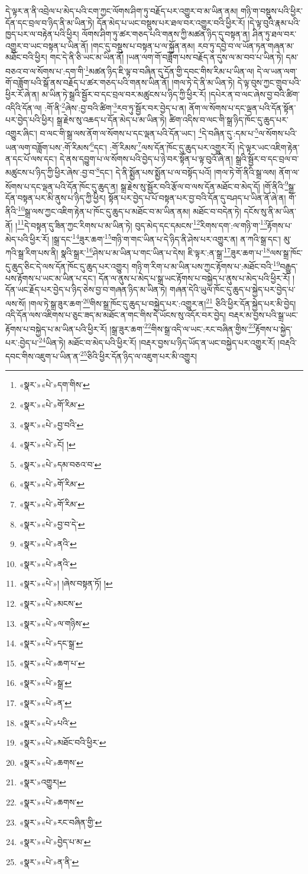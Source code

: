 དེ་ལྟར་ན་ནི་འབྲེལ་པ་མེད་པའི་ངག་ཀྱང་ལོགས་ཤིག་ཏུ་བརྗོད་པར་འགྱུར་བ་མ་ཡིན་ནམ། གཉི་ག་བསྡུས་པའི་ཕྱིར་དོན་དང་བྲལ་བ་ཉིད་ནི་མ་ཡིན་ཏེ། དོན་མེད་པ་ཡང་བསྡུས་པར་ཐལ་བར་འགྱུར་བའི་ཕྱིར་རོ། །དེ་ལྟ་བུའི་རྣམ་པའི་ཁྱད་པར་ལ་བརྟེན་པའི་ཕྱིར། ལོགས་ཤིག་ཏུ་ཚར་གཅད་པའི་གནས་ཀྱི་མཚན་ཉིད་དུ་བསྟན་ན། ཤིན་ཏུ་ཐལ་བར་འགྱུར་བ་ཡང་བསྟན་པ་ཡིན་ནོ། །གང་དུ་བསྡུས་པ་བསྟན་པ་ལ་སྐྱོན་ནམ། རབ་ཏུ་དབྱེ་བ་ལ་ཡོན་ཏན་གཞན་མ་མཐོང་བའི་ཕྱིར། གང་དེ་ནི་ཅི་ཡང་མ་ཡིན་ནོ། །ཡན་ལག་གོ་བཟློག་པས་བརྗོད་ན་དུས་ལ་མ་བབ་པ་ཡིན་ཏེ། དམ་བཅའ་བ་ལ་སོགས་པ་:དག་གི་\footnote{«སྣར་»«པེ་»དག་གིས་}མཚན་ཉིད་ཇི་ལྟ་བ་བཞིན་དུ་དོན་གྱི་དབང་གིས་རིམ་པ་ཡིན་ལ། དེ་ལ་ཡན་ལག་གོ་བཟློག་པའི་སྒོ་ནས་བརྗོད་པ་ཚར་གཅད་པའི་གནས་ཡིན་ནོ། །གལ་ཏེ་དེ་ནི་མ་ཡིན་ཏེ། དེ་ལྟ་བུས་ཀྱང་གྲུབ་པའི་ཕྱིར་རོ་ཞེ་ན། མ་ཡིན་ཏེ་སྒྲའི་སྦྱོར་བ་དང་བྲལ་བར་མཚུངས་པ་ཉིད་ཀྱི་ཕྱིར་རོ། །དཔེར་ན་བ་ལང་ཞེས་བྱ་བའི་ཚིག་འདིའི་དོན་ལ། :གོ་ནི་\footnote{«སྣར་»«པེ་»གོ་རིམ་}ཞེས་:བྱ་བའི་ཚིག་\footnote{«སྣར་»«པེ་»བྱ་བའི་}རབ་ཏུ་སྦྱོར་བར་བྱེད་པ་ན། ནོག་ལ་སོགས་པ་དང་ལྡན་པའི་དོན་སྟོན་པར་བྱེད་པའི་ཕྱིར། སྒྲ་རྗེས་སུ་འཆད་པ་དོན་མེད་པ་མ་ཡིན་ཏེ། ཚིག་འདིས་བ་ལང་གི་སྒྲ་ཉིད་ཁོང་དུ་ཆུད་པར་འགྱུར་ཞིང་། བ་ལང་གི་སྒྲ་ལས་ནོག་ལ་སོགས་པ་དང་ལྡན་པའི་དོན་ཡང་། \footnote{«སྣར་»«པེ་»ངོ། ། }དེ་བཞིན་དུ་:དམ་པ་\footnote{«སྣར་»«པེ་»དམ་བཅའ་བ་}ལ་སོགས་པའི་ཡན་ལག་བཟློག་པས་:གོ་རིམས་\footnote{«སྣར་»«པེ་»གོ་རིམ་}དང་། :གོ་རིམས་\footnote{«སྣར་»«པེ་»གོ་རིམ་}ལས་དོན་ཁོང་དུ་ཆུད་པར་འགྱུར་རོ། །དེ་ལྟར་ཡང་འཇིག་རྟེན་ན་དང་པོ་ལས་དང་། དེ་ནས་དབྱུག་པ་ལ་སོགས་པའི་བྱེད་པ་ཉེ་བར་སྟོན་པ་ལྟ་བུའོ་ཞེ་ན། སྒྲའི་སྦྱོར་བ་དང་བྲལ་བ་མཚུངས་པ་ཉིད་ཀྱི་ཕྱིར་ཞེས་:བྱ་བ་\footnote{«སྣར་»«པེ་»བྱ་བ་དེ་}དང་། དེ་ནི་སྨྱོན་པས་སྨྱོན་པ་ལ་བསྟོད་པའོ། །གལ་ཏེ་གོ་ནིའི་སྒྲ་ལས། ནོག་ལ་སོགས་པ་དང་ལྡན་པའི་དོན་ཁོང་དུ་ཆུད་ན། སྒྲ་རྗེས་སུ་སྦྱོར་བའི་རྩོལ་བ་ལས་དོན་མཐོང་བ་མེད་དོ། །གོ་ནིའི་\footnote{«སྣར་»«པེ་»ནའི་}སྒྲ་དོན་བསྟན་པར་མི་ནུས་པ་ཉིད་ཀྱི་ཕྱིར། སྟོན་པར་བྱེད་པ་པོ་བསྟན་པར་བྱ་བའི་དོན་དུ་བཤད་པ་ཡིན་ནོ་ཞེ་ན། གོ་ནིའི་\footnote{«སྣར་»«པེ་»ནའི་}སྒྲ་ལས་ཀྱང་འཇིག་རྟེན་པ་ཁོང་དུ་ཆུད་པ་མཐོང་བ་མ་ཡིན་ནམ། མཐོང་བ་བདེན་ཏེ། དངོས་སུ་ནི་མ་ཡིན་ནོ། །\footnote{«སྣར་»«པེ་»། །ཞེས་བསྟན་ཏོ། །}དེ་བསྟན་དུ་ཟིན་ཀྱང་རིགས་པ་མ་ཡིན་ཏེ། བུད་མེད་དང་དམངས་\footnote{«སྣར་»«པེ་»མངས་}རིགས་དག་:ལ་གཉི་ག་\footnote{«སྣར་»«པེ་»ལ་གཉིས་}རྟོགས་པ་མེད་པའི་ཕྱིར་རོ། །སྒྲ་དང་\footnote{«སྣར་»«པེ་»དང་སྒྲ་}ཟུར་ཆག་\footnote{«སྣར་»«པེ་»ཆག་པ་}གཉི་ག་གང་ཡིན་པ་དེ་ཉིད་ནི་ཤེས་པར་འགྱུར་ན། ན་ཀའི་སྒྲ་དང་། མུ་ཀའི་སྒྲ་རིག་པས་ནི། སྣའི་སྒྲར་\footnote{«སྣར་»«པེ་»སྒྲ་}ཤེས་པ་མ་ཡིན་པ་གང་ཡིན་པ་དེས། ཇི་ལྟར་:ན་སྒྲ་\footnote{«སྣར་»«པེ་»ན་}ཟུར་ཆག་པ་\footnote{«སྣར་»«པེ་»པའི་}ལས་སྒྲ་ཁོང་དུ་ཆུད་ཅིང་དེ་ལས་དོན་ཁོང་དུ་ཆུད་པར་འགྱུར། གཉི་ག་རིག་པ་མ་ཡིན་པས་ཀྱང་རྟོགས་པ་:མཐོང་བའི་\footnote{«སྣར་»«པེ་»མཐོང་བའི་ཕྱིར་}བརྒྱུད་པས་རྟོགས་པ་ཡང་མ་ཡིན་པ་དང་། དོན་ལ་ནུས་པ་མེད་པ་སྒྲ་ཡང་རྟོགས་པ་བསྐྱེད་པ་ནུས་པ་མེད་པའི་ཕྱིར་རོ། །དོན་ཡང་རྗོད་པར་བྱེད་པ་ཉིད་ཅེས་བྱ་བ་གཞན་ཉིད་མ་ཡིན་ཏེ། གཞན་དེའི་ཡུལ་ཁོང་དུ་ཆུད་པ་སྐྱེད་པར་བྱེད་པ་ལས་སོ། །གལ་ཏེ་སྒྲ་ཟུར་ཆག་\footnote{«སྣར་»«པེ་»ཆགས་}གིས་སྒྲ་ཁོང་དུ་ཆུད་པ་བསྐྱེད་པར་:འགྱུར་ན།\footnote{«སྣར་»འགྱུར།} ཅིའི་ཕྱིར་དོན་སྐྱེད་པར་མི་བྱེད། འདི་དོན་ལས་འཇིགས་པ་ཅུང་ཟད་མ་མཐོང་ན་གང་གིས་དེ་ཡོངས་སུ་འདོར་བར་བྱེད། བརྡར་མ་བྱས་པའི་སྒྲ་ཡང་རྟོགས་པ་བསྐྱེད་པ་མ་ཡིན་པའི་ཕྱིར་རོ། །སྒྲ་ཟུར་ཆག་\footnote{«སྣར་»«པེ་»ཆགས་}གིས་སྒྲ་འདི་ལ་ཡང་:རང་བཞིན་གྱིས་\footnote{«སྣར་»«པེ་»རང་བཞིན་གྱི་}རྟོགས་པ་སྐྱེད་པར་:བྱེད་པ་\footnote{«སྣར་»«པེ་»བྱེད་པ་མ་}ཡིན་ཏེ། མཐོང་བ་མེད་པའི་ཕྱིར་རོ། །བརྡར་བྱས་པ་ཉིད་ཡོད་ན་ཡང་བསྐྱེད་པར་འགྱུར་རོ། །བརྡའི་དབང་གིས་འཇུག་པ་ཡིན་ན་\footnote{«སྣར་»«པེ་»ན་ནི་}ཅིའི་ཕྱིར་དོན་ཉིད་ལ་འཇུག་པར་མི་འགྱུར། 